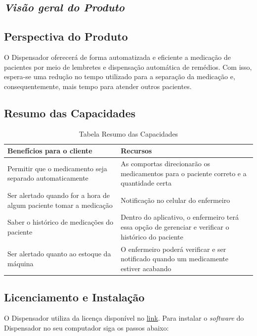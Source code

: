 \begin{apendicesenv}
\section{\textit{Visão geral do Produto}}
\subsection*{Perspectiva do Produto}

O Dispensador oferecerá de forma automatizada e eficiente a medicação de pacientes por meio de lembretes e dispensação automática de remédios. Com isso, espera-se uma redução no tempo utilizado para a separação da medicação e, consequentemente, mais tempo para atender outros pacientes.

\subsection*{Resumo das Capacidades}

\begin{table}[H]
    \centering
    \caption{Tabela Resumo das Capacidades}
    \begin{tabularx}{\textwidth}{|G{7.5cm}|G{7.5cm}|}
        \hline
        \textbf{Benefícios para o cliente} & \textbf{Recursos} \\ \hline
        
        Permitir que o medicamento seja separado automaticamente & As comportas direcionarão os medicamentos para o paciente correto e a quantidade certa \\\hline
        
        Ser alertado quando for a hora de algum paciente tomar a medicação & Notificação no celular do enfermeiro \\ \hline
        
        Saber o histórico de medicações do paciente & Dentro do aplicativo, o enfermeiro terá essa opção de gerenciar e verificar o histórico do paciente\\ \hline
        
        Ser alertado quanto ao estoque da máquina & O enfermeiro poderá verificar e ser notificado quando um medicamente estiver acabando\\ \hline
    \end{tabularx}
\end{table}

\subsection*{Licenciamento e Instalação}
O Dispensador utiliza da licença  disponível no  \href{https://opensource.org/licenses/MIT}{link}. Para instalar o \textit{software} do Dispensador no seu computador siga os passos abaixo:


\end{apendicesenv}
